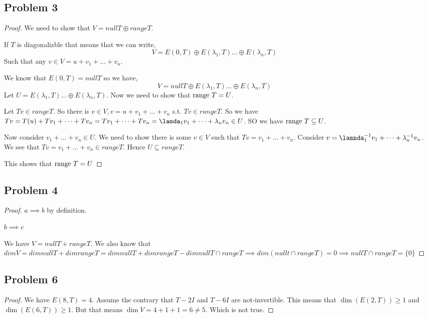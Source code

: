 \documentclass[a4paper]{report}
\begin{document}
\subsection*{Problem 3}
\begin{proof}
   We need to show that $V = null T \oplus range T$.

   If $T$ is diagonalizble that means that we can write,  
   $$ V = E(0, T) \oplus E(\lambda_1, T) \dots \oplus E(\lambda_n, T) $$ 
   Such that any $v \in V = u + v_1 + \dots + v_n$. 

   We know that $E(0,T) = null T$ so we have,  
   $$ V = null T \oplus E(\lambda_1, T) \dots \oplus E(\lambda_n, T) $$ 
   Let $U =  E(\lambda_1, T) \dots \oplus E(\lambda_n, T) $. Now we need to show that $\text{range } T = U$.

   Let $Tv \in range T$. So there is $v \in V, v  = u + v_1 + \dots + v_n$ s.t. $Tv \in range T$. So we have  $Tv = T(u) + Tv_1 + \dots + Tv_n = Tv_1 + \dots + Tv_n = \lamda_1v_1 + \dots + \lambda_n v_n \in U$. SO we have $\text{range } T \subseteq U$.

   Now consider $v_1+ \dots + v_n \in U$. We need to show there is some $v \in V$ such that $Tv = v_1 + \dots + v_n$. Consider $v = \lamnda_1^{-1}v_1 + \dots + \lambda_n^{-1}v_n$. We see that $Tv = v_1 + \dots + v_n \in range T$. Hence $U \subseteq range T$.

   This shows that  $\text{range } T = U$


\end{proof}
\subsection*{Problem 4}
\begin{proof}
   $a \implies b$ by definition.

   $b \implies c$

   We have $V = null T + range T$. We also know that $dim V = dim null T + dim range T = dim null T + dim range T - dim null T \cap range T \implies dim (null t \cap range T) = 0 \implies null T \cap range T = \{0\}$
\end{proof}
\subsection*{Problem 6}
\begin{proof}
   We have $E(8,T) = 4$. Assume the contrary that $T - 2I$ and $T - 6I$ are not-invertible. This means that $\dim (E(2,T)) \ge 1$ and $\dim(E(6,T)) \ge 1$. But that means $\dim V = 4 + 1 + 1 = 6 \ne 5$. Which is not true.
\end{proof}
\end{document}
